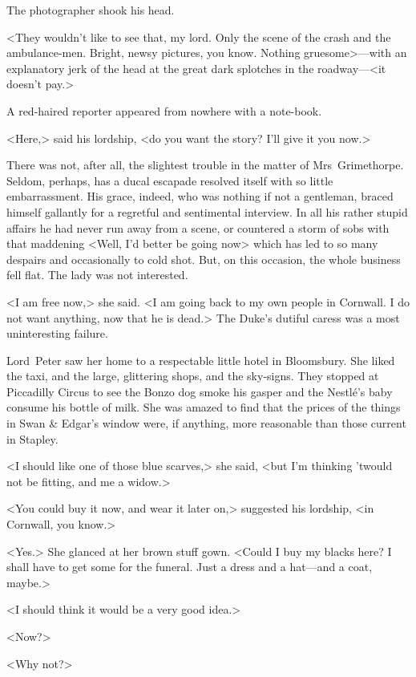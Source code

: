 The photographer shook his head.

<They wouldn't like to see that, my lord. Only the scene of the crash and the ambulance-men. Bright, newsy pictures, you know. Nothing gruesome>—with an explanatory jerk of the head at the great dark splotches in the roadway—<it doesn't pay.>

A red-haired reporter appeared from nowhere with a note-book.

<Here,> said his lordship, <do you want the story? I'll give it you now.> 

\divider

There was not, after all, the slightest trouble in the matter of Mrs~Grimethorpe. Seldom, perhaps, has a ducal escapade resolved itself with so little embarrassment. His grace, indeed, who was nothing if not a gentleman, braced himself gallantly for a regretful and sentimental interview. In all his rather stupid affairs he had never run away from a scene, or countered a storm of sobs with that maddening <Well, I'd better be going now> which has led to so many despairs and occasionally to cold shot. But, on this occasion, the whole business fell flat. The lady was not interested.

<I am free now,> she said. <I am going back to my own people in Cornwall. I do not want anything, now that he is dead.> The Duke's dutiful caress was a most uninteresting failure.

Lord~Peter saw her home to a respectable little hotel in Bloomsbury.  She liked the taxi, and the large, glittering shops, and the sky-signs.  They stopped at Piccadilly Circus to see the Bonzo dog smoke his gasper and the Nestlé's baby consume his bottle of milk. She was amazed to find that the prices of the things in Swan \& Edgar's window were, if anything, more reasonable than those current in Stapley.

<I should like one of those blue scarves,> she said, <but I'm thinking 'twould not be fitting, and me a widow.>

<You could buy it now, and wear it later on,> suggested his lordship, <in Cornwall, you know.>

<Yes.> She glanced at her brown stuff gown. <Could I buy my blacks here? I shall have to get some for the funeral. Just a dress and a hat—and a coat, maybe.>

<I should think it would be a very good idea.>

<Now?>

<Why not?>

